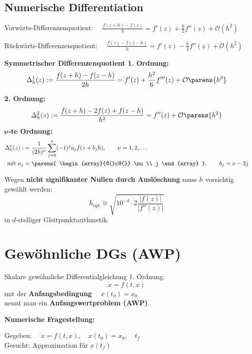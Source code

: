	\subsection{Numerische Differentiation}
		\label{subsec:numerische_differentiation}
		Vorwärts-Differenzenquotient: $\quad \displaystyle \frac{f(z+h) - f(z)}{h}= f'(z) + \frac{h}{2}f''(z) + \mathcal{O}\left( h^2\right) $

		Rückwärts-Differenzenquotient: $\quad\displaystyle\frac{f(z)-f(z-h)}{h}= f'(z) - \frac{h}{2}f''(z) + \mathcal{O}\left( h^2\right)$

		\textbf{Symmetrischer Differenzenquotient 1. Ordnung:}
		\[
			\Delta_h^1(z):=\frac{f(z+h)-f(z-h)}{2h}= f'(z) + \frac{h^2}{6}f'''(z) + \mathcal{O} \parens{h^3}
		\]

		\textbf{2. Ordnung:}
		\[
			\Delta_h^2(z):=\frac{f(z+h)-2f(z)+f(z-h)}{h^2}= f''(z) + \mathcal{O} \parens{ h^2 }
		\]
		$\boldsymbol{\nu}$\textbf{-te Ordnung:}
		\begin{align*}
			\Delta_h^\nu(z):&= \frac{1}{(2h)^\nu}\sum\limits_{j=0}^\nu (-1)^ja_jf(z+b_jh) ,\qquad \nu = 1,2,\dots\\
			\text{mit } a_j &= \parens{
				\begin{array}{@{}c@{}}
					\nu \\
					j
				\end{array}
			}, \qquad b_j = \nu-2j
		\end{align*}

		Wegen \textbf{nicht signifikanter Nullen durch Auslöschung} muss $h$ vorsichtig gewählt werden:
		\[
			h_\text{opt} \cong \sqrt{10^{-d}\cdot 2 \frac{|f(z)|}{|f''(z)|}}
		\]
		in $d$-stelliger Gleitpunktarithmetik.

\section{Gewöhnliche DGs (AWP)}
	Skalare gewöhnliche Differentialgleichung 1. Ordnung:
	\begin{equation}
		\dot x = f(t,x) \label{dx}
	\end{equation}
	mit der \textbf{Anfangsbedingung} $\quad x(t_0) = x_0$ \\
	nennt man ein \textbf{Anfangswertproblem (AWP)}.

	\textbf{Numerische Fragestellung:}

	Gegeben: $\quad \dot x = f(t,x), \quad x(t_0 ) = x_0, \quad t_f $ \\
	Gesucht: Approximation für $x(t_f)$

